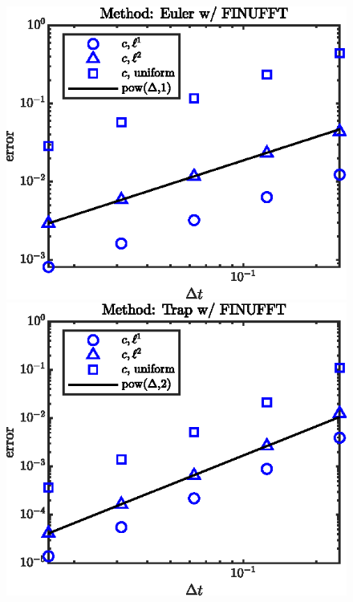\documentclass[11pt,letterpaper]{article}
\begin{document}
\begin{figure}[H]
    \centering
    \includegraphics{figs/conv_order_finu_Euler}
    \includegraphics{figs/conv_order_finu_Trap}

\end{figure}
\end{document}
